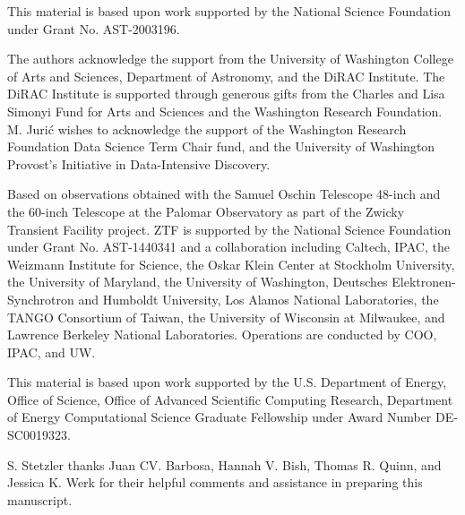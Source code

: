 \documentclass[twocolumn, linenumbers]{aastex631}
\begin{document}
\begin{acknowledgments}
This material is based upon work supported by the National Science Foundation under Grant No. AST-2003196.

The authors acknowledge the support from the University of Washington College of Arts and Sciences, Department of Astronomy, and the DiRAC Institute. The DiRAC Institute is supported through generous gifts from the Charles and Lisa Simonyi Fund for Arts and Sciences and the Washington Research Foundation. M. Juri\'{c} wishes to acknowledge the support of the Washington Research Foundation Data Science Term Chair fund, and the University of Washington Provost’s Initiative in Data-Intensive Discovery. 

Based on observations obtained with the Samuel Oschin Telescope 48-inch and the 60-inch Telescope at the Palomar Observatory as part of the Zwicky Transient Facility project. ZTF is supported by the National Science Foundation under Grant No. AST-1440341 and a collaboration including Caltech, IPAC, the Weizmann Institute for Science, the Oskar Klein Center at Stockholm University, the University of Maryland, the University of Washington, Deutsches Elektronen-Synchrotron and Humboldt University, Los Alamos National Laboratories, the TANGO Consortium of Taiwan, the University of Wisconsin at Milwaukee, and Lawrence Berkeley National Laboratories. Operations are conducted by COO, IPAC, and UW.

This material is based upon work supported by the U.S. Department of Energy, Office of Science, Office of Advanced Scientific Computing Research, Department of Energy Computational Science Graduate Fellowship under Award Number DE-SC0019323.

S. Stetzler thanks Juan CV. Barbosa, Hannah V. Bish, Thomas R. Quinn, and Jessica K. Werk for their helpful comments and assistance in preparing this manuscript.
\end{acknowledgments}

{}

\end{document}
